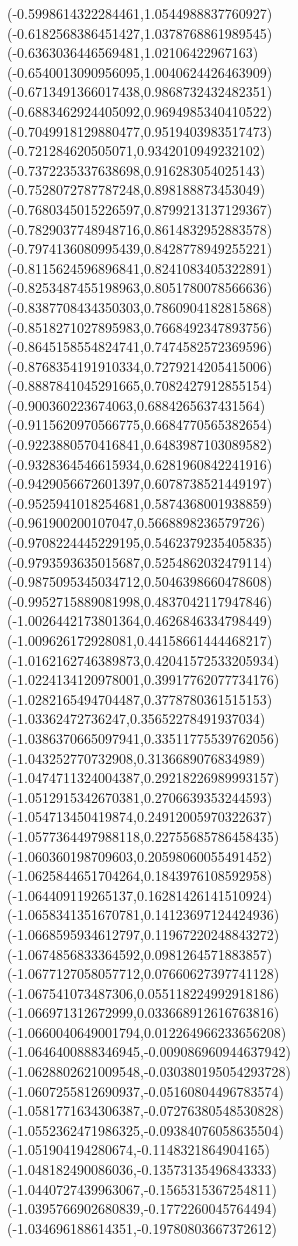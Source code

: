 {(-0.5998614322284461,1.0544988837760927)
(-0.6182568386451427,1.0378768861989545)
(-0.6363036446569481,1.02106422967163)
(-0.6540013090956095,1.0040624426463909)
(-0.6713491366017438,0.9868732432482351)
(-0.6883462924405092,0.9694985340410522)
(-0.7049918129880477,0.9519403983517473)
(-0.721284620505071,0.9342010949232102)
(-0.7372235337638698,0.916283054025143)
(-0.7528072787787248,0.898188873453049)
(-0.7680345015226597,0.8799213137129367)
(-0.7829037748948716,0.8614832952883578)
(-0.7974136080995439,0.8428778949255221)
(-0.8115624596896841,0.8241083405322891)
(-0.8253487455198963,0.8051780078566636)
(-0.8387708434350303,0.7860904182815868)
(-0.8518271027895983,0.7668492347893756)
(-0.8645158554824741,0.7474582572369596)
(-0.8768354191910334,0.7279214205415006)
(-0.8887841045291665,0.7082427912855154)
(-0.900360223674063,0.6884265637431564)
(-0.9115620970566775,0.6684770565382654)
(-0.9223880570416841,0.6483987103089582)
(-0.9328364546615934,0.6281960842241916)
(-0.9429056672601397,0.6078738521449197)
(-0.9525941018254681,0.5874368001938859)
(-0.961900200107047,0.5668898236579726)
(-0.9708224445229195,0.5462379235405835)
(-0.9793593635015687,0.5254862032479114)
(-0.9875095345034712,0.5046398660478608)
(-0.9952715889081998,0.4837042117947846)
(-1.0026442173801364,0.4626846334798449)
(-1.009626172928081,0.44158661444468217)
(-1.0162162746389873,0.42041572533205934)
(-1.0224134120978001,0.39917762077734176)
(-1.0282165494704487,0.3778780361515153)
(-1.03362472736247,0.35652278491937034)
(-1.0386370665097941,0.33511775539762056)
(-1.043252770732908,0.3136689076834989)
(-1.0474711324004387,0.29218226989993157)
(-1.0512915342670381,0.2706639353244593)
(-1.054713450419874,0.24912005970322637)
(-1.0577364497988118,0.22755685786458435)
(-1.060360198709603,0.20598060055491452)
(-1.0625844651704264,0.1843976108592958)
(-1.064409119265137,0.16281426141510924)
(-1.0658341351670781,0.14123697124424936)
(-1.0668595934612797,0.11967220248843272)
(-1.0674856833364592,0.0981264571883857)
(-1.0677127058057712,0.07660627397741128)
(-1.067541073487306,0.055118224992918186)
(-1.066971312672999,0.033668912616763816)
(-1.0660040649001794,0.012264966233656208)
(-1.0646400888346945,-0.009086960944637942)
(-1.0628802621009548,-0.030380195054293728)
(-1.0607255812690937,-0.05160804496783574)
(-1.0581771634306387,-0.07276380548530828)
(-1.0552362471986325,-0.09384076058635504)
(-1.051904194280674,-0.1148321864904165)
(-1.048182490086036,-0.13573135496843333)
(-1.0440727439963067,-0.1565315367254811)
(-1.0395766902680839,-0.1772260045764494)
(-1.034696188614351,-0.19780803667372612)
}
